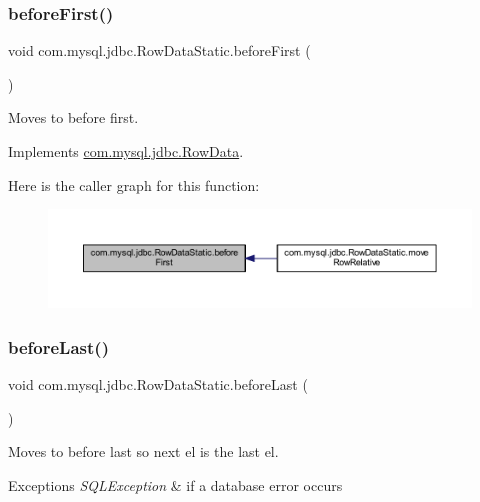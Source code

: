 \subsubsection{\texorpdfstring{before\+First()}{beforeFirst()}}
{\footnotesize\ttfamily void com.\+mysql.\+jdbc.\+Row\+Data\+Static.\+before\+First (\begin{DoxyParamCaption}{ }\end{DoxyParamCaption})}

Moves to before first. 

Implements \mbox{\hyperlink{interfacecom_1_1mysql_1_1jdbc_1_1_row_data_a3c1836b8c63ae7d859b8b0f1613ef244}{com.\+mysql.\+jdbc.\+Row\+Data}}.

Here is the caller graph for this function\+:
\nopagebreak
\begin{figure}[H]
\begin{center}
\leavevmode
\includegraphics[width=350pt]{classcom_1_1mysql_1_1jdbc_1_1_row_data_static_a54d6e62be02d4dac8e48a6eef0b2d839_icgraph}
\end{center}
\end{figure}
\mbox{\label{classcom_1_1mysql_1_1jdbc_1_1_row_data_static_a9e4636345525191c4dfa6ac57a3a05dc}} 
\subsubsection{\texorpdfstring{before\+Last()}{beforeLast()}}
{\footnotesize\ttfamily void com.\+mysql.\+jdbc.\+Row\+Data\+Static.\+before\+Last (\begin{DoxyParamCaption}{ }\end{DoxyParamCaption})}

Moves to before last so next el is the last el.


\begin{DoxyExceptions}{Exceptions}
{\em S\+Q\+L\+Exception} & if a database error occurs \\
\hline
\end{DoxyExceptions}



